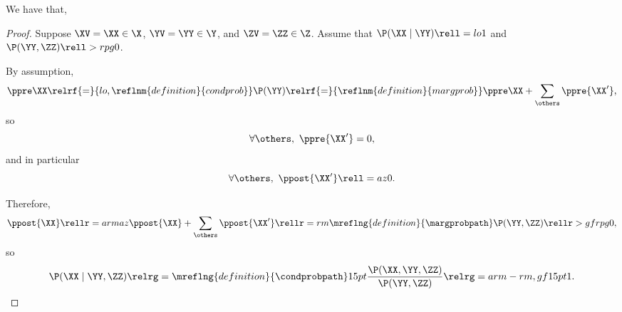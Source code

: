 \begin{proposition}
  We have that, %
\end{proposition}

\begin{proof}
  Suppose 
  $\XV = \XX \in \X$,
  $\YV = \YY \in \Y$, and
  $\ZV = \ZZ \in \Z$. Assume that $\P(\XX \mid \YY) \rell = lo 1$ and $\P(\YY, \ZZ) \rell > rpg 0$.

  By assumption,
  $$\ppre\XX \relrf{=}{lo,\reflnm{definition}{condprob}} \P(\YY) 
  \relrf{=}{\reflnm{definition}{margprob}} \ppre\XX + \sum_{\others}\ppre{\XX'},$$
    so
    $$\forall \others,\ \ppre{\XX'} = 0,$$
  and in particular
  $$\forall \others,\ \ppost{\XX'} \rell = az 0.$$

  Therefore, $$\ppost{\XX} \rellr = arm az \ppost{\XX} + \sum_{\others}\ppost{\XX'} \rellr = rm \mreflng{definition}{\margprobpath} \P(\YY, \ZZ) \rellr > gf rpg 0,$$
  so $$\P(\XX \mid \YY, \ZZ) \relrg = \mreflng{definition}{\condprobpath} 15pt \frac{\P(\XX, \YY, \ZZ)}{\P(\YY, \ZZ)} \relrg = arm-rm,gf 15pt 1.$$%
\end{proof}

